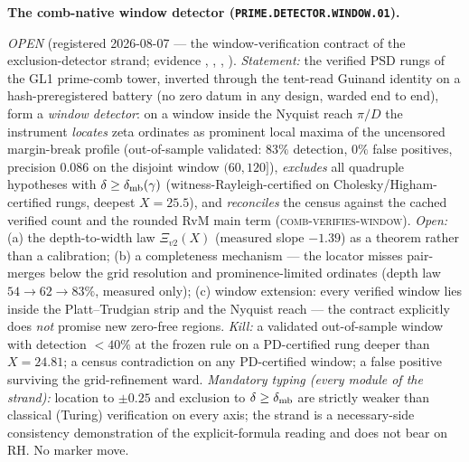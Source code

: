 \par\smallskip\noindent\textbf{The comb-native window detector
(\texttt{PRIME.DETECTOR.WINDOW.01}).}
{\sloppy
\emph{OPEN} (registered 2026-08-07 --- the window-verification
contract of the exclusion-detector strand; evidence
,
,
,
).  \emph{Statement:} the
verified PSD rungs of the GL1 prime-comb tower, inverted through
the tent-read Guinand identity on a hash-preregistered battery
(no zero datum in any design, warded end to end), form a
\emph{window detector}: on a window inside the Nyquist reach
$\pi/D$ the instrument \emph{locates} zeta ordinates as
prominent local maxima of the uncensored margin-break profile
(out-of-sample validated: $83\%$ detection, $0\%$ false
positives, precision $0.086$ on the disjoint window $(60, 120]$),
\emph{excludes} all quadruple hypotheses with $\delta \ge
\delta_{\rm mb}(\gamma)$ (witness-Rayleigh-certified on
Cholesky/Higham-certified rungs, deepest $X = 25.5$), and
\emph{reconciles} the census against the cached verified count
and the rounded RvM main term
(\textsc{comb-verifies-window}).  \emph{Open:} (a) the
depth-to-width law $\Xi_{v2}(X)$ (measured slope $-1.39$) as a
theorem rather than a calibration; (b) a completeness mechanism
--- the locator misses pair-merges below the grid resolution and
prominence-limited ordinates (depth law $54 \to 62 \to 83\%$,
measured only); (c) window extension: every verified window lies
inside the Platt--Trudgian strip and the Nyquist reach --- the
contract explicitly does \emph{not} promise new zero-free
regions.  \emph{Kill:} a validated out-of-sample window with
detection $< 40\%$ at the frozen rule on a PD-certified rung
deeper than $X = 24.81$; a census contradiction on any
PD-certified window; a false positive surviving the
grid-refinement ward.  \emph{Mandatory typing (every module of
the strand):} location to $\pm 0.25$ and exclusion to $\delta \ge
\delta_{\rm mb}$ are strictly weaker than classical (Turing)
verification on every axis; the strand is a necessary-side
consistency demonstration of the explicit-formula reading and
does not bear on RH.  No marker move.\par}


